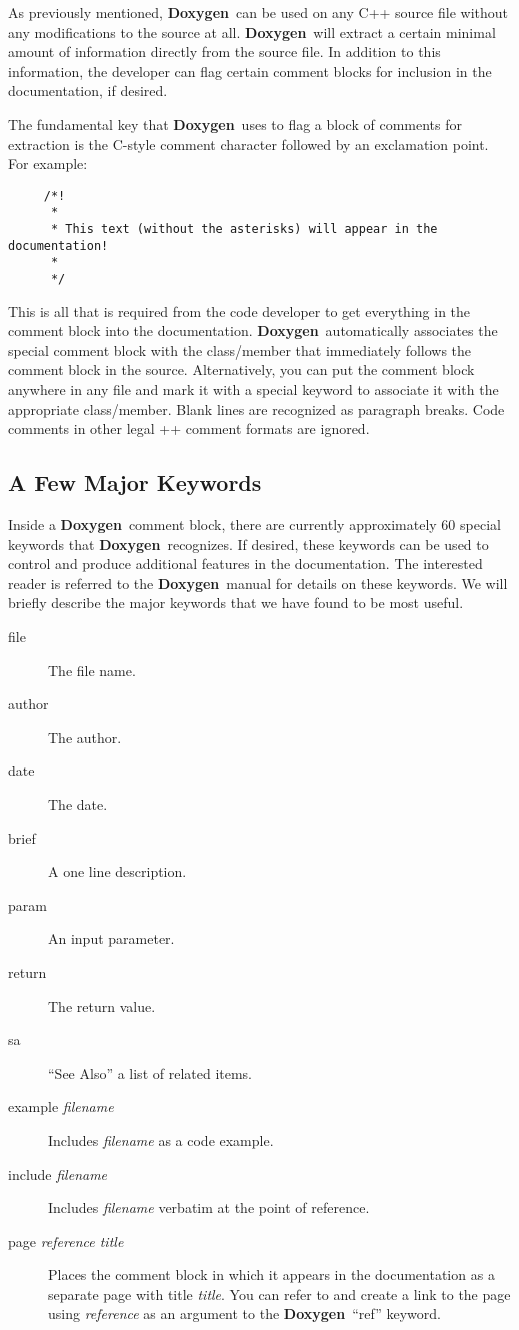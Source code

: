 \documentclass[11pt]{nmemo}
\newcommand{\doxy}{{\normalfont\bfseries Doxygen}}
\begin{document}
As previously mentioned, \doxy\ can be used on any C++ source file
without any modifications to the source at all.  \doxy\ will extract a
certain minimal amount of information directly from the source file.
In addition to this information, the developer can flag certain
comment blocks for inclusion in the documentation, if desired.

The fundamental key that \doxy\ uses to flag a block of comments for
extraction is the C-style comment character followed by an exclamation
point. For example:
\begin{verbatim}
     /*!
      *
      * This text (without the asterisks) will appear in the documentation!
      *
      */
\end{verbatim}
This is all that is required from the code developer to get everything
in the comment block into the documentation. \doxy\ automatically associates
the special comment block with the class/member that immediately follows the 
comment block in the source. Alternatively, you can put the comment block
anywhere in any file and mark it with a special keyword to associate it
with the appropriate class/member. Blank lines are recognized as paragraph
breaks. Code comments in other legal \C++ comment formats are ignored.

\subsection{A Few Major Keywords}

Inside a \doxy\ comment block, there are currently approximately 60
special keywords that \doxy\ recognizes. If desired, these keywords
can be used to control and produce additional features in the
documentation.  The interested reader is referred to the \doxy\ manual
for details on these keywords.  We will briefly describe the major
keywords that we have found to be most useful.
\begin{description}
\item [file] The file name.
\item [author] The author.
\item [date] The date.
\item [brief] A one line description.
\item [param] An input parameter.
\item [return] The return value.
\item [sa] ``See Also'' a list of related items.
\item [example {\em filename}] Includes {\em filename} as a code
  example.
\item [include {\em filename}] Includes {\em filename} verbatim at the
  point of reference.
\item [page {\em reference title}] Places the comment block in which
  it appears in the documentation as a separate page with title {\em
    title}. You can refer to and create a link to the page using {\em
    reference} as an argument to the \doxy\ ``ref'' keyword.
\end{description}
\end{document}
